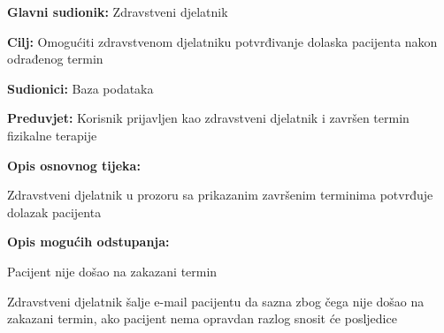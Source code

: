 \noindent {}
\begin{packed_item}
	
	\item \textbf{Glavni sudionik: }Zdravstveni djelatnik
	\item  \textbf{Cilj:} Omogućiti zdravstvenom djelatniku potvrđivanje dolaska pacijenta nakon odrađenog termin
	\item  \textbf{Sudionici:} Baza podataka
	\item  \textbf{Preduvjet:} Korisnik prijavljen kao zdravstveni djelatnik i završen termin fizikalne terapije
	\item  \textbf{Opis osnovnog tijeka:}
	
	\item[] \begin{packed_enum}
		
		\item Zdravstveni djelatnik u prozoru sa prikazanim završenim terminima potvrđuje dolazak pacijenta
	\end{packed_enum}
	
	\item  \textbf{Opis mogućih odstupanja:}
	
	\item[] \begin{packed_item}
		
		\item[1.a] Pacijent nije došao na zakazani termin
		\item[] \begin{packed_enum}
			
			\item Zdravstveni djelatnik šalje e-mail pacijentu da sazna zbog čega nije došao na zakazani termin, ako pacijent nema opravdan razlog snosit će posljedice
			
		\end{packed_enum}
		
	\end{packed_item}
	
\end{packed_item}

